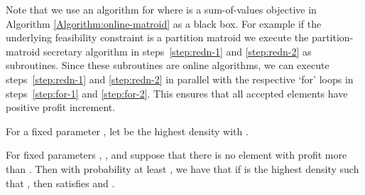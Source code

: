 Note that we use an algorithm for
 where  is a sum-of-values objective in Algorithm
\ref{Algorithm:online-matroid} as a black box. For example if the
underlying feasibility constraint is a partition matroid we execute
the partition-matroid secretary algorithm in steps~\ref{step:redn-1}
and \ref{step:redn-2} as subroutines. Since these subroutines are online algorithms, 
we can execute steps~\ref{step:redn-1} and
\ref{step:redn-2} in parallel with the respective `for' loops in
steps~\ref{step:for-1} and \ref{step:for-2}. This ensures that all
accepted elements have positive profit increment.

\begin{definition}
For a fixed parameter , let  be the highest density with .
\end{definition}

\begin{lemma}
  \label{lem:main} 
For fixed parameters , ,
 and  suppose that there is no element
with profit more than . Then with
probability at least , we have that if  is the highest density  
such that ,
then  satisfies
 and
.
\end{lemma}

